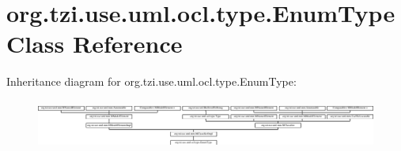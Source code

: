 \hypertarget{classorg_1_1tzi_1_1use_1_1uml_1_1ocl_1_1type_1_1_enum_type}{\section{org.\-tzi.\-use.\-uml.\-ocl.\-type.\-Enum\-Type Class Reference}
\label{classorg_1_1tzi_1_1use_1_1uml_1_1ocl_1_1type_1_1_enum_type}
}
Inheritance diagram for org.\-tzi.\-use.\-uml.\-ocl.\-type.\-Enum\-Type\-:\begin{figure}[H]
\begin{center}
\leavevmode
\includegraphics[height=1.666667cm]{classorg_1_1tzi_1_1use_1_1uml_1_1ocl_1_1type_1_1_enum_type}
\end{center}
\end{figure}

